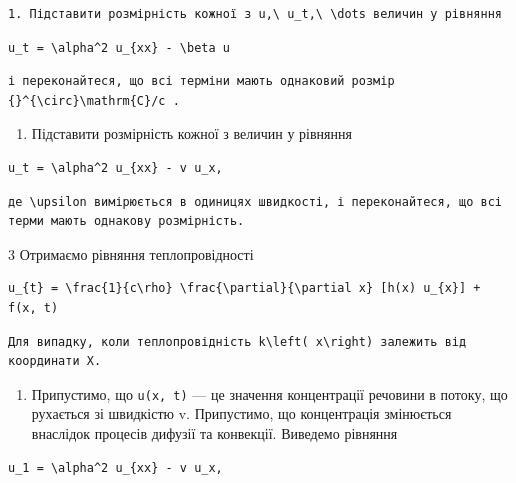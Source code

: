 \documentclass[
  ukrainian,
]{article}
\providecommand{\tightlist}{%
  \setlength{\itemsep}{0pt}\setlength{\parskip}{0pt}}
\begin{document}
\begin{verbatim}
1. Підставити розмірність кожної з u,\ u_t,\ \dots величин у рівняння
\end{verbatim}

\begin{verbatim}
u_t = \alpha^2 u_{xx} - \beta u
\end{verbatim}

\begin{verbatim}
і переконайтеся, що всі терміни мають однаковий розмір {}^{\circ}\mathrm{C}/c .
\end{verbatim}

\begin{enumerate}
\def\labelenumi{\arabic{enumi}.}
\setcounter{enumi}{1}
\tightlist
\item
  Підставити розмірність кожної з величин у рівняння
\end{enumerate}

\begin{verbatim}
u_t = \alpha^2 u_{xx} - v u_x,
\end{verbatim}

\begin{verbatim}
де \upsilon вимірюється в одиницях швидкості, і переконайтеся, що всі терми мають однакову розмірність.
\end{verbatim}

3 Отримаємо рівняння теплопровідності

\begin{verbatim}
u_{t} = \frac{1}{c\rho} \frac{\partial}{\partial x} [h(x) u_{x}] + f(x, t)
\end{verbatim}

\begin{verbatim}
Для випадку, коли теплопровідність k\left( x\right) залежить від координати X.
\end{verbatim}

\begin{enumerate}
\def\labelenumi{\arabic{enumi}.}
\setcounter{enumi}{3}
\tightlist
\item
  Припустимо, що \texttt{u(x,\ t)} --- це значення концентрації речовини
  в потоку, що рухається зі швидкістю v. Припустимо, що концентрація
  змінюється внаслідок процесів дифузії та конвекції. Виведемо рівняння
\end{enumerate}

\begin{verbatim}
u_1 = \alpha^2 u_{xx} - v u_x,
\end{verbatim}
\end{document}

